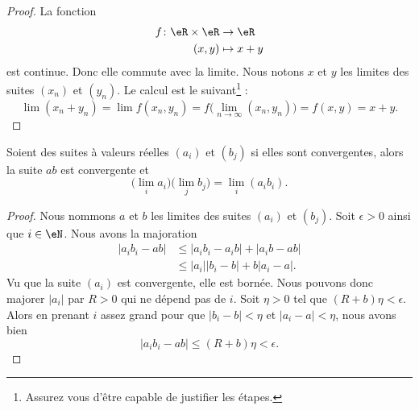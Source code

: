 \begin{proof}
    La fonction 
    \begin{equation}
        \begin{aligned}
            f\colon \eR\times \eR&\to \eR \\
            (x,y)&\mapsto x+y 
        \end{aligned}
    \end{equation}
    est continue. Donc elle commute avec la limite. Nous notons \( x\) et \( y\) les limites des suites \( (x_n)\) et \( (y_n)\). Le calcul est le suivant\footnote{Assurez vous d'être capable de justifier les étapes.} :
    \begin{equation}
        \lim (x_n+y_n)=\lim f(x_n,y_n)=f\big( \lim_{n\to \infty} (x_n,y_n) \big)=f(x,y)=x+y.
    \end{equation}
\end{proof}

\begin{proposition}     \label{PROPooIQOAooJPMoDD}
    Soient des suites à valeurs réelles \( (a_i)\) et \( (b_j)\) si elles sont convergentes, alors la suite \( ab\) est convergente et
    \begin{equation}
        \big( \lim_ia_i \big)\big( \lim_jb_j \big)=\lim_i(a_ib_i).
    \end{equation}
\end{proposition}

\begin{proof}
    Nous nommons \( a\) et \( b\) les limites des suites \( (a_i)\) et \( (b_j)\). Soit \( \epsilon>0\) ainsi que \( i\in \eN\). Nous avons la majoration
    \begin{subequations}
        \begin{align}
            | a_ib_i-ab |&\leq | a_ib_i-a_ib |+| a_ib-ab |\\
            &\leq | a_i | |b_i-b |+b| a_i-a |.
        \end{align}
    \end{subequations}
    Vu que la suite \( (a_i)\) est convergente, elle est bornée. Nous pouvons donc majorer \( | a_i |\) par \( R>0\) qui ne dépend pas de \( i\). Soit \( \eta>0\) tel que \( (R+b)\eta<\epsilon\). Alors en prenant \( i\) assez grand pour que \( | b_i-b |<\eta\) et \( | a_i-a |<\eta\), nous avons bien
    \begin{equation}
        | a_ib_i-ab |\leq (R+b)\eta<\epsilon.
    \end{equation}
\end{proof}
 
